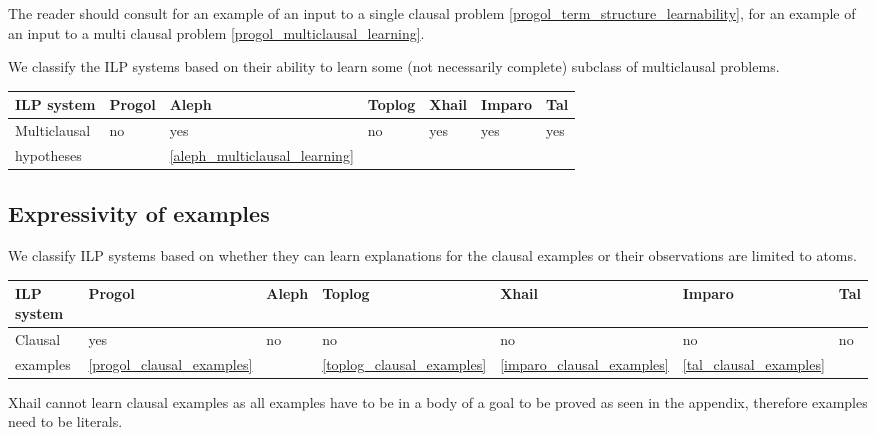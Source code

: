 The reader should consult for an example of an input to a single clausal problem \ref{progol_term_structure_learnability}, for an example of an input to a multi clausal problem \ref{progol_multiclausal_learning}.

We classify the ILP systems based on their ability to learn some (not necessarily complete) subclass of multiclausal problems.

\begin{center}
 \label{tab:title} 
\begin{tabular}{| l | l | l | l | l | l | l |}
    \hline
    ILP system & Progol & Aleph & Toplog & Xhail & Imparo & Tal \\ \hline
    Multiclausal& no & yes & no & 
    yes & yes & yes \\ 
     hypotheses & \cite{muggleton2012mc}&\ref{aleph_multiclausal_learning}&
     \cite{muggleton2012mc}&\cite{muggleton2012mc}&\cite{muggleton2012mc}&
     \cite{muggleton2012mc}\\ 
    \hline
\end{tabular}
\end{center}

\subsection{Expressivity of examples}
We classify ILP systems based on whether they can learn explanations for the clausal examples or their observations are limited to atoms.

\begin{center}
 \label{tab:title} 
\begin{tabular}{| l | l | l | l | l | l | l |}
    \hline
    ILP system & Progol & Aleph & Toplog & Xhail & Imparo & Tal \\ \hline
    Clausal& yes & no & no & 
    no & no & no \\ 
     examples & \ref{progol_clausal_examples} &\cite{aleph2007}&
     \ref{toplog_clausal_examples}&
     \ref{imparo_clausal_examples}&\ref{tal_clausal_examples}\\
    \hline
\end{tabular}
\end{center}

Xhail cannot learn clausal examples as all examples have to be in a body of a goal to be proved as seen in the appendix, therefore examples need to be literals.

